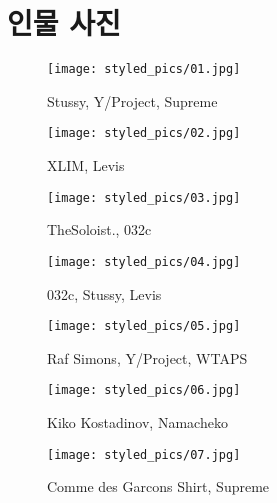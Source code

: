 \section*{인물 사진}
\begin{minipage}[h!]{0.5\textwidth}
    \begin{figure}[H]
        \texttt{[image: styled\_pics/01.jpg]}
        \caption*{Stussy, Y/Project, Supreme}
    \end{figure}
\end{minipage}
\begin{minipage}[h!]{0.5\textwidth}
    \begin{figure}[H]
        \texttt{[image: styled\_pics/02.jpg]}
        \caption*{XLIM, Levis}
    \end{figure}
\end{minipage}
\begin{minipage}[h!]{0.5\textwidth}
    \begin{figure}[H]
        \texttt{[image: styled\_pics/03.jpg]}
        \caption*{TheSoloist., 032c}
    \end{figure}
\end{minipage}
\begin{minipage}[h!]{0.5\textwidth}
    \begin{figure}[H]
        \texttt{[image: styled\_pics/04.jpg]}
        \caption*{032c, Stussy, Levis}
    \end{figure}
\end{minipage}
\begin{minipage}[h!]{0.5\textwidth}
    \begin{figure}[H]
        \texttt{[image: styled\_pics/05.jpg]}
        \caption*{Raf Simons, Y/Project, WTAPS}
    \end{figure}
\end{minipage}
\begin{minipage}[h!]{0.5\textwidth}
    \begin{figure}[H]
        \texttt{[image: styled\_pics/06.jpg]}
        \caption*{Kiko Kostadinov, Namacheko}
    \end{figure}
\end{minipage}
\begin{minipage}[h!]{0.5\textwidth}
    \begin{figure}[H]
        \texttt{[image: styled\_pics/07.jpg]}
        \caption*{Comme des Garcons Shirt, Supreme}
    \end{figure}
\end{minipage}
